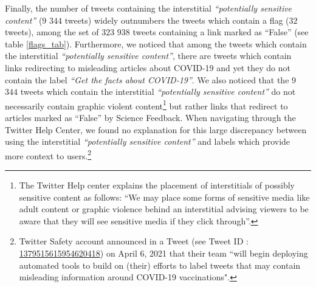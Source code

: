 \documentclass{article}
\begin{document}
Finally, the number of tweets containing the interstitial {\it ``potentially sensitive content''} ($9$ $344$ tweets) widely outnumbers the tweets which contain a flag ($32$ tweets), among the set of $323$ $938$ tweets containing a link marked as ``False'' (see table \ref{flags_tab}). Furthermore, we noticed that among the tweets which contain the interstitial {\it ``potentially sensitive content''}, there are tweets which contain links redirecting to misleading articles about COVID-19 and yet they do not contain the label { \it ``Get the facts about COVID-19''}. We also noticed that the $9$ $344$ tweets which contain the interstitial {\it ``potentially sensitive content''} do not necessarily contain graphic violent content\footnote{The Twitter Help center explains the placement of interstitials of possibly sensitive content as follows: ``We may place some forms of sensitive media like adult content or graphic violence behind an interstitial advising viewers to be aware that they will see sensitive media if they click through''.} but rather links that redirect to articles marked as ``False'' by Science Feedback. When navigating through the Twitter Help Center, we found no explanation for this large discrepancy between using the interstitial {\it ``potentially sensitive content''} and labels which provide more context to users.\footnote{Twitter Safety account announced in a Tweet (see Tweet ID : \href{https://twitter.com/TwitterSafety/status/1379515615954620418}{1379515615954620418}) on April 6, 2021 that their team ``will begin deploying automated tools to build on (their) efforts to label tweets that may contain misleading information around COVID-19 vaccinations".}  
\end{document}
